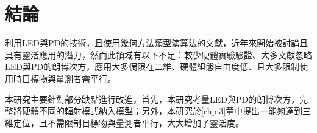         



        

        




\section{結論}
\label{chp:2_conclusion}

利用LED與PD的技術，且使用幾何方法類型演算法的文獻，近年來開始被討論且具有靈活應用的潛力，然而此領域有以下不足：較少硬體實驗驗證、大多文獻忽略LED與PD的朗博次方，應用大多侷限在二維、硬體組態自由度低、且大多限制使用時目標物與量測者需平行。

本研究主要針對部分缺點進行改進，首先，本研究考量LED與PD的朗博次方，完整將硬體不同的輻射模式納入模型；另外，本研究於\ref{chp:3}章中提出一能夠達到三維定位，且不需限制目標物與量測者平行，大大增加了靈活度。

